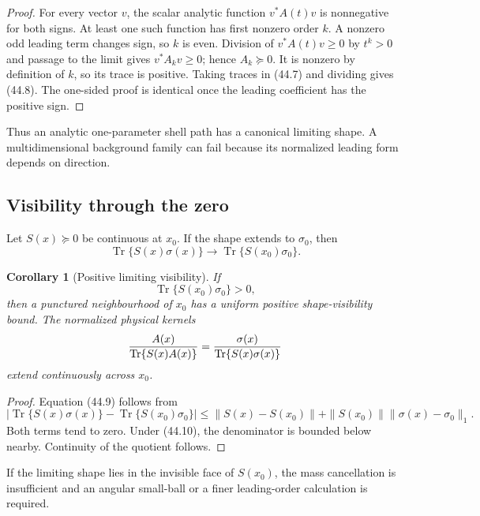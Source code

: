 \documentclass[11pt]{article}
\newtheorem{corollary}[theorem]{Corollary}
\theoremstyle{remark}
\begin{document}
\begin{proof}
For every vector \(v\), the scalar analytic function
\(v^*A(t)v\) is nonnegative for both signs.  At least one such
function has first nonzero order \(k\).  A nonzero odd leading term
changes sign, so \(k\) is even.  Division of
\(v^*A(t)v\geq0\) by \(t^k>0\) and passage to the limit gives
\(v^*A_kv\geq0\); hence \(A_k\succeq0\).
It is nonzero by definition of \(k\), so its trace is positive.
Taking traces in (44.7) and dividing gives (44.8).  The one-sided
proof is identical once the leading coefficient has the positive
sign.
\end{proof}

Thus an analytic one-parameter shell path has a canonical limiting
shape.  A multidimensional background family can fail because its
normalized leading form depends on direction.

\subsection{Visibility through the zero}

Let \(S(x)\succeq0\) be continuous at \(x_0\).  If the shape extends
to \(\sigma_0\), then
\begin{equation}
 \operatorname{Tr}\{S(x)\sigma(x)\}
 \longrightarrow
 \operatorname{Tr}\{S(x_0)\sigma_0\}.             \tag{44.9}
\end{equation}

\begin{corollary}[Positive limiting visibility]
\label{cor:v12v44-visibility}
If
\begin{equation}
 \operatorname{Tr}\{S(x_0)\sigma_0\}>0,           \tag{44.10}
\end{equation}
then a punctured neighbourhood of \(x_0\) has a uniform positive
shape-visibility bound.  The normalized physical kernels
\[
 {A(x)\over\operatorname{Tr}\{S(x)A(x)\}}
 =
 {\sigma(x)\over\operatorname{Tr}\{S(x)\sigma(x)\}}
\]
extend continuously across \(x_0\).
\end{corollary}

\begin{proof}
Equation (44.9) follows from
\[
 |\operatorname{Tr}\{S(x)\sigma(x)\}
   -\operatorname{Tr}\{S(x_0)\sigma_0\}|
 \leq
 \|S(x)-S(x_0)\|
 +
 \|S(x_0)\|\|\sigma(x)-\sigma_0\|_1.
\]
Both terms tend to zero.  Under (44.10), the denominator is bounded
below nearby.  Continuity of the quotient follows.
\end{proof}

If the limiting shape lies in the invisible face of \(S(x_0)\), the
mass cancellation is insufficient and an angular small-ball or a
finer leading-order calculation is required.
\end{document}
